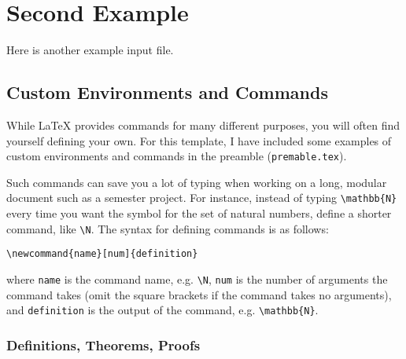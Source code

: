 
\chapter{Second Example}
\label{ch:second-example}

Here is another example input file.

\section{Custom Environments and Commands}
\label{sec:custom}

While \LaTeX{} provides commands for many different purposes, you will often find yourself defining your own.
For this template, I have included some examples of custom environments and commands in the preamble (\texttt{premable.tex}).

Such commands can save you a lot of typing when working on a long, modular document such as a semester project.
For instance, instead of typing \verb!\mathbb{N}! every time you want the symbol for the set of natural numbers, define a shorter command, like \verb!\N!.
The syntax for defining commands is as follows:
%
\begin{verbatim}
\newcommand{name}[num]{definition}
\end{verbatim}
%
where \texttt{name} is the command name, e.g. \verb!\N!, \texttt{num} is the number of arguments the command takes (omit the square brackets if the command takes no arguments), and \texttt{definition} is the output of the command, e.g. \verb!\mathbb{N}!.


\subsection{Definitions, Theorems, Proofs}
\label{sec:thms}

